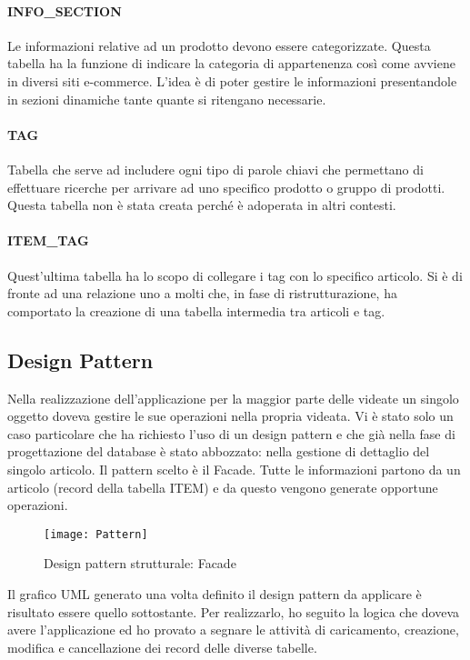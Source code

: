 \paragraph{INFO\_SECTION}
Le informazioni relative ad un prodotto devono essere categorizzate. Questa tabella ha la funzione di indicare la categoria di appartenenza così come avviene in diversi siti e-commerce. L'idea è di poter gestire le informazioni presentandole in sezioni dinamiche tante quante si ritengano necessarie. 

\paragraph{TAG}
Tabella che serve ad includere ogni tipo di parole chiavi che permettano di effettuare ricerche per arrivare ad uno specifico prodotto o gruppo di prodotti. Questa tabella non è stata creata perché è adoperata in altri contesti.

\paragraph{ITEM\_TAG}
Quest'ultima tabella ha lo scopo di collegare i tag con lo specifico articolo. Si è di fronte ad una relazione uno a molti che, in fase di ristrutturazione, ha comportato la creazione di una tabella intermedia tra articoli e tag.



\subsection{Design Pattern}
Nella realizzazione dell'applicazione per la maggior parte delle videate un singolo oggetto doveva gestire le sue operazioni nella propria videata. Vi è stato solo un caso particolare che ha richiesto l'uso di un design pattern e che già nella fase di progettazione del database è stato abbozzato: nella gestione di dettaglio del singolo articolo.
Il pattern scelto è il Facade. Tutte le informazioni partono da un articolo (record della tabella ITEM) e da questo vengono generate opportune operazioni.\\

\begin{figure}[!h] 
	\centering 
	\texttt{[image: Pattern]} 
	\caption{Design pattern strutturale: Facade}
	\label{Pattern}
\end{figure}


Il grafico UML generato una volta definito il design pattern da applicare è risultato essere quello sottostante. Per realizzarlo, ho seguito la logica che doveva avere l'applicazione ed ho provato a segnare le attività di caricamento, creazione, modifica e cancellazione dei record delle diverse tabelle.

